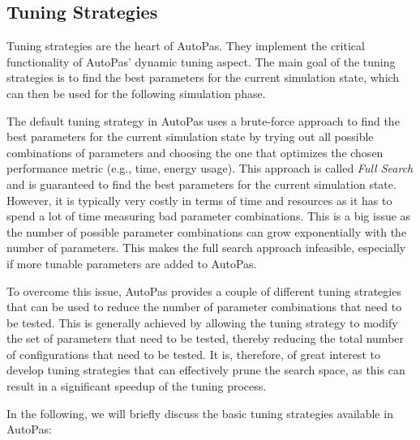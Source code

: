 \subsection*{Tuning Strategies}

Tuning strategies are the heart of AutoPas. They implement the critical functionality of AutoPas' dynamic tuning aspect. The main goal of the tuning strategies is to find the best parameters for the current simulation state, which can then be used for the following simulation phase.

The default tuning strategy in AutoPas uses a brute-force approach to find the best parameters for the current simulation state by trying out all possible combinations of parameters and choosing the one that optimizes the chosen performance metric (e.g., time, energy usage). This approach is called \emph{Full Search} and is guaranteed to find the best parameters for the current simulation state. However, it is typically very costly in terms of time and resources as it has to spend a lot of time measuring bad parameter combinations. This is a big issue as the number of possible parameter combinations can grow exponentially with the number of parameters. This makes the full search approach infeasible, especially if more tunable parameters are added to AutoPas.

To overcome this issue, AutoPas provides a couple of different tuning strategies that can be used to reduce the number of parameter combinations that need to be tested. This is generally achieved by allowing the tuning strategy to modify the set of parameters that need to be tested, thereby reducing the total number of configurations that need to be tested. It is, therefore, of great interest to develop tuning strategies that can effectively prune the search space, as this can result in a significant speedup of the tuning process.

In the following, we will briefly discuss the basic tuning strategies available in AutoPas:

